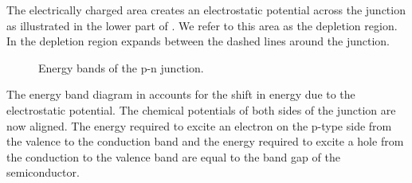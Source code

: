 The electrically charged area creates an electrostatic potential across the junction as illustrated in the lower part of .
We refer to this area as the depletion region.
In  the depletion region expands between the dashed lines around the junction.
\begin{figure}[H]
	\centering
	
	\caption{Energy bands of the p-n junction.}\label{fig:pn_junction}
\end{figure}
The energy band diagram in  accounts for the shift in energy due to the electrostatic potential.
The chemical potentials of both sides of the junction are now aligned.
The energy required to excite an electron on the p-type side from the valence to the conduction band and the energy required to excite a hole from the conduction to the valence band are equal to the band gap of the semiconductor.

